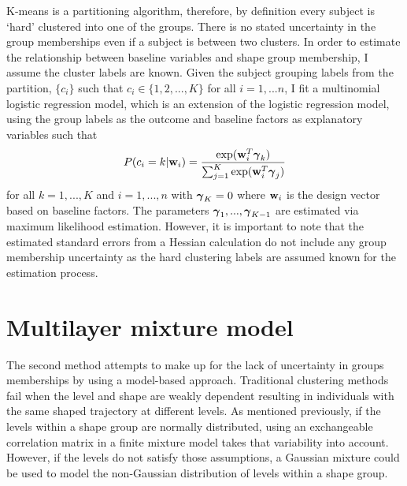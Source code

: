 K-means is a partitioning algorithm, therefore, by definition every subject is `hard' clustered into one of the groups. There is no stated uncertainty in the group memberships even if a subject is between two clusters. In order to estimate the relationship between baseline variables and shape group membership, I assume the cluster labels are known. Given the subject grouping labels from the partition, $\{c_{i}\}$ such that $c_{i}\in\{1,2,...,K\}$ for all $i=1,...n$, I fit a multinomial logistic regression model, which is an extension of the logistic regression model, using the group labels as the outcome and baseline factors as explanatory variables such that
$$P(c_{i} = k|\mathbf w_{i}) = \frac{\exp(\mathbf w_{i}^{T}\boldsymbol\gamma_{k})}{\sum_{j=1}^{K}\exp(\mathbf w_{i}^{T}\boldsymbol\gamma_{j})}$$
for all $k=1,...,K$ and $i=1,...,n$ with $\boldsymbol\gamma_{K}=0$ where $\mathbf w_{i}$ is the design vector based on baseline factors. The parameters $\boldsymbol\gamma_{1},...,\boldsymbol\gamma_{K-1}$ are estimated via maximum likelihood estimation. However, it is important to note that the estimated standard errors from a Hessian calculation do not include any group membership uncertainty  as the hard clustering labels are assumed known for the estimation process.


\section{Multilayer mixture model}\label{sec:multi}
The second method attempts to make up for the lack of uncertainty in groups memberships by using a model-based approach. Traditional clustering methods fail when the level and shape are weakly dependent resulting in individuals with the same shaped trajectory at different levels. As mentioned previously, if the levels within a shape group are normally distributed, using an exchangeable correlation matrix in a finite mixture model takes that variability into account. However, if the levels do not satisfy those assumptions, a Gaussian mixture could be used to model the non-Gaussian distribution of levels within a shape group. 

